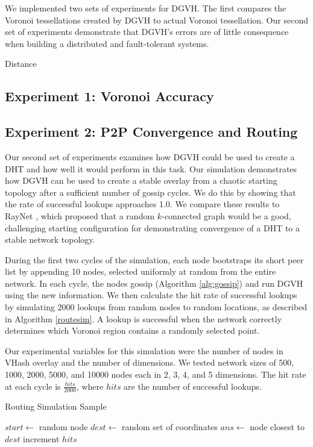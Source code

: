 \documentclass[11pt, conference, letterpaper]{IEEEtran}
\begin{document}
We implemented two sets of experiments for DGVH.
The first compares the Voronoi tessellations created by DGVH to actual Voronoi tessellation.
Our second set of experiments demonstrate that DGVH's errors are of little consequence when building a distributed and fault-tolerant systems.


Distance

\subsection{Experiment 1:  Voronoi Accuracy}

\subsection{Experiment 2: P2P Convergence and Routing}
Our second set of experiments examines how DGVH could be used to create a DHT and how well it would perform in this task.
Our simulation demonstrates how DGVH  can be used to create a stable overlay from a chaotic starting topology after a sufficient number of gossip cycles.  
We do this by showing that the rate of successful lookups approaches 1.0.
We compare these results to RayNet \cite{raynet}, which proposed that a random $k$-connected graph would be a good, challenging starting configuration for demonstrating convergence of a DHT to a stable network topology.

During the first two cycles of the simulation, each node bootstraps its short peer list by appending 10 nodes, selected uniformly at random from the entire network.
In each cycle, the nodes gossip (Algorithm \ref{alg:gossip}) and run DGVH using the new information.
We then calculate the hit rate of successful lookups by simulating 2000 lookups from random nodes to random locations, as described in Algorithm \ref{routesim}.
A lookup is successful when the network correctly determines which Voronoi region contains a randomly selected point.


Our experimental variables for this simulation were the number of nodes in VHash overlay and the number of dimensions.  
We tested network sizes of 500, 1000, 2000, 5000, and 10000 nodes each in 2, 3, 4, and 5 dimensions.
The hit rate at each cycle is $\frac{hits}{2000}$, where $hits$ are the number of successful lookups.




\begin{algorithm}
	\caption{Routing Simulation Sample}
	\label{routesim}
	\begin{algorithmic}[1]  %
		\STATE $start \leftarrow$ random node
		\STATE $dest \leftarrow$ random set of coordinates
		\STATE $ans \leftarrow$ node closest to $dest$
		\STATE increment $hits$
		\ENDIF
	\end{algorithmic} 
\end{algorithm}
\end{document}
